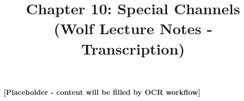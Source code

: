 \documentclass{article}
\title{Chapter 10: Special Channels \\ {\small (Wolf Lecture Notes - Transcription)}}
\date{}
\begin{document}
\maketitle
\tableofcontents

\textbf{[Placeholder - content will be filled by OCR workflow]}
\end{document}
